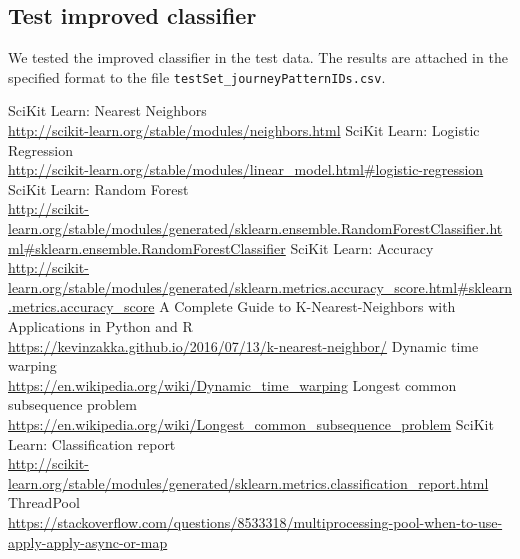\documentclass[12pt]{article}
\begin{document}
	\subsection{Test improved classifier}
	
  We tested the improved classifier in the test data. The results are attached
  in the specified format to the file \texttt{testSet\_journeyPatternIDs.csv}.
	
	\newpage
	\begin{thebibliography}{30}
		SciKit Learn: Nearest Neighbors \\
		 \url{http://scikit-learn.org/stable/modules/neighbors.html}
		  SciKit Learn: Logistic Regression \\
		 \url{http://scikit-learn.org/stable/modules/linear_model.html#logistic-regression}
		  SciKit Learn: Random Forest \\
		 \url{http://scikit-learn.org/stable/modules/generated/sklearn.ensemble.RandomForestClassifier.html#sklearn.ensemble.RandomForestClassifier}
		  SciKit Learn: Accuracy \\
		 \url{http://scikit-learn.org/stable/modules/generated/sklearn.metrics.accuracy_score.html#sklearn.metrics.accuracy_score}
		 A Complete Guide to K-Nearest-Neighbors with Applications in Python and R \\
		 \url{https://kevinzakka.github.io/2016/07/13/k-nearest-neighbor/}
		  Dynamic time warping \\
		 \url{https://en.wikipedia.org/wiki/Dynamic_time_warping}
		  Longest common subsequence problem \\
		 \url{https://en.wikipedia.org/wiki/Longest_common_subsequence_problem}
		  SciKit Learn: Classification report \\
		 \url{http://scikit-learn.org/stable/modules/generated/sklearn.metrics.classification_report.html}
		  ThreadPool \\
		 \url{https://stackoverflow.com/questions/8533318/multiprocessing-pool-when-to-use-apply-apply-async-or-map}
    \end{thebibliography}
	
\end{document}
